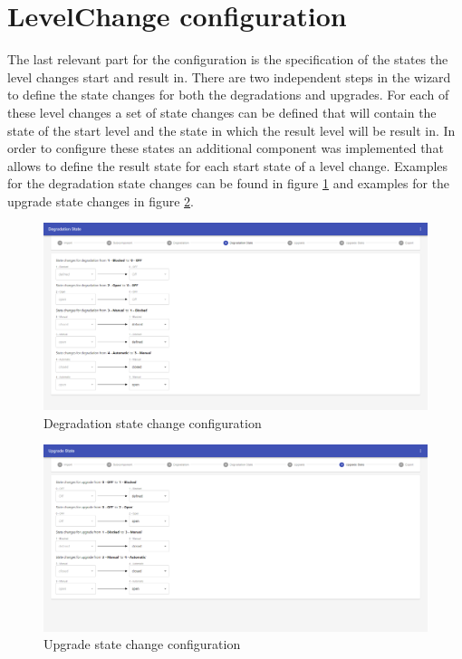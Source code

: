 \section{LevelChange configuration}
The last relevant part for the configuration is the specification of the states the level changes start and result in. There are two independent steps in the wizard to define the state changes for both the degradations and upgrades. For each of these level changes a set of state changes can be defined that will contain the state of the start level and the state in which the result level will be result in. In order to configure these states an additional component was implemented that allows to define the result state for each start state of a level change. Examples for the degradation state changes can be found in figure \ref{fig:deg_state_change} and examples for the upgrade state changes in figure \ref{fig:upg:state_change}. 

\begin{figure}[ht]
    \centering
    \includegraphics[width=\textwidth]{img/degradation_level_change_states.png}
    \caption{Degradation state change configuration}
    \label{fig:deg_state_change}
\end{figure}

\begin{figure}[ht]
    \centering
    \includegraphics[width=\textwidth]{img/upgrade_level_change_states.png}
    \caption{Upgrade state change configuration}
    \label{fig:upg:state_change}
\end{figure}

